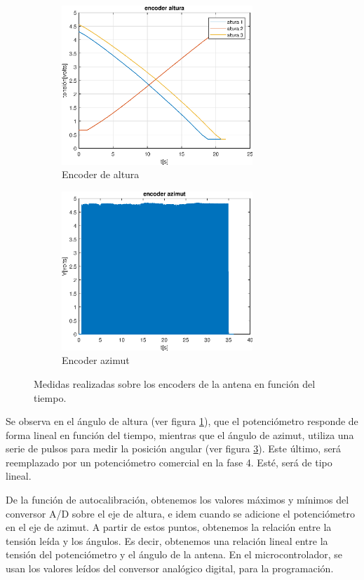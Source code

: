 \begin{figure}[ht]
    \hspace{-10mm}
	\begin{subfigure}[t]{0.5\textwidth}
		\includegraphics[width=\textwidth,height=6cm]{medidas_cenit} 
		\caption{Encoder de altura} 
		\label{subfig:altura} 
	\end{subfigure}
	\hspace{10mm}	
	\begin{subfigure}[t]{0.5\textwidth}
		\includegraphics[width=\textwidth,height=6cm]{medidas_azimut}
		\caption{Encoder azimut}  
		\label{subfig:azimut} 
	\end{subfigure}
	\caption{Medidas realizadas sobre los encoders de la antena en función del tiempo.}
\end{figure}


Se observa en el ángulo de altura (ver figura \ref{subfig:altura}), que el potenciómetro responde de forma lineal en función del tiempo, mientras que el ángulo de azimut, utiliza una serie de pulsos para medir la posición angular (ver figura  \ref{subfig:azimut}). Este último, será reemplazado por un potenciómetro comercial en la fase 4. Esté, será de tipo lineal. 

De la función de autocalibración, obtenemos los valores máximos y mínimos del conversor A/D sobre el eje de altura, e idem cuando se adicione el potenciómetro en el eje de azimut. A partir de estos puntos, obtenemos la relación entre la tensión leída y los ángulos. Es decir, obtenemos una relación lineal entre la tensión del potenciómetro y el ángulo de la antena. En el microcontrolador, se usan los valores leídos del conversor analógico digital, para la programación.

